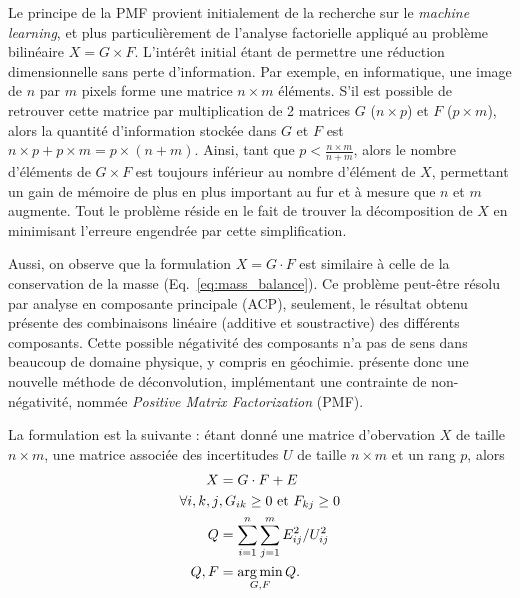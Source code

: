 Le principe de la PMF provient initialement de la recherche sur le \textit{machine
learning}, et plus particulièrement de l'analyse factorielle appliqué au problème
bilinéaire $X=G\times F$. L'intérêt initial étant de permettre une réduction
dimensionnelle sans perte d'information. Par exemple, en informatique, une image de $n$
par $m$ pixels forme une matrice $n\times m$ éléments. S'il est possible de retrouver
cette matrice par multiplication de 2 matrices $G$ ($n\times p$) et $F$ ($p \times m$),
alors la quantité d'information stockée dans $G$ et $F$ est $n
\times p + p \times m = p \times (n + m)$. Ainsi, tant que $p < \frac{n\times m}{n+m}$,
alors le nombre d'éléments de $G\times F$ est toujours inférieur au nombre d'élément de
$X$, permettant un gain de mémoire de plus en plus important au fur et à mesure que $n$ et
$m$ augmente.
Tout le problème réside en le fait de trouver la décomposition de $X$ en minimisant
l'erreure engendrée par cette simplification.

Aussi, on observe que la formulation $X = G\cdot F$ est similaire à celle de
la conservation de la masse (Eq.~\ref{eq:mass_balance}). Ce problème peut-être résolu par
analyse en composante principale (ACP), seulement, le résultat obtenu présente des
combinaisons linéaire (additive et soustractive) des différents composants. Cette possible
négativité des composants n'a pas de sens dans beaucoup de domaine physique, y compris en
géochimie. \textcite{paateroPositive1994} présente donc une nouvelle méthode de
déconvolution, implémentant une contrainte de non-négativité, nommée \textit{Positive Matrix
Factorization} (PMF). 

La formulation est la suivante : étant donné une matrice d'obervation $X$ de taille
$n\times m$, une matrice associée des incertitudes $U$ de taille $n \times m$ et un rang
$p$, alors 
\begin{align}
    \label{eq:pmf_formulation}
    X &= G \cdot F + E \\
    \forall i,k,j &, G_{ik}\geq 0 \text{ et } F_{kj}\geq 0\\
    Q &= \sum_{i=1}^n\sum_{j=1}^m E_{ij}^2/U_{ij}^2\\
    {Q, F} &= \operatorname*{arg\,min}_{G,F} Q.
\end{align}

